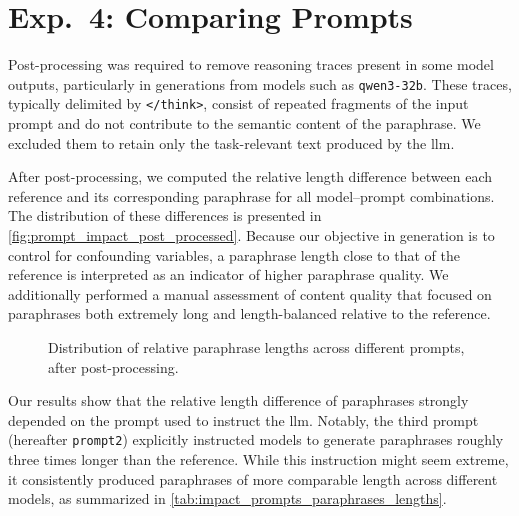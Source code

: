 \section{Exp.\ 4: Comparing Prompts}%
\label{subsec:prompt_impact_res}


Post-processing was required to remove reasoning traces present in some model outputs, particularly in generations from models such as \texttt{qwen3-32b}. 
These traces, typically delimited by \texttt{</think>}, consist of repeated fragments of the input prompt and do not contribute to the semantic content of the paraphrase. 
We excluded them to retain only the task-relevant text produced by the \ac{llm}.

After post-processing, we computed the relative length difference between each reference and its corresponding paraphrase for all model–prompt combinations. 
The distribution of these differences is presented in \autoref{fig:prompt_impact_post_processed}. 
Because our objective in \imp{} generation is to control for confounding variables, a paraphrase length close to that of the reference is interpreted as an indicator of higher paraphrase quality. 
We additionally performed a manual assessment of content quality that focused on paraphrases both extremely long and length-balanced relative to the reference.

\begin{figure}[htbp]
    \centering
    
    \caption[Impact of different prompts on paraphrases.]{
    Distribution of relative paraphrase lengths across different prompts, after post-processing.    
    }
    \label{fig:prompt_impact_post_processed}
\end{figure}

Our results show that the relative length difference of paraphrases strongly depended on the prompt used to instruct the \ac{llm}. 
Notably, the third prompt (hereafter \texttt{prompt2}) explicitly instructed models to generate paraphrases roughly three times longer than the reference. 
While this instruction might seem extreme, it consistently produced paraphrases of more comparable length across different models, as summarized in \autoref{tab:impact_prompts_paraphrases_lengths}.


